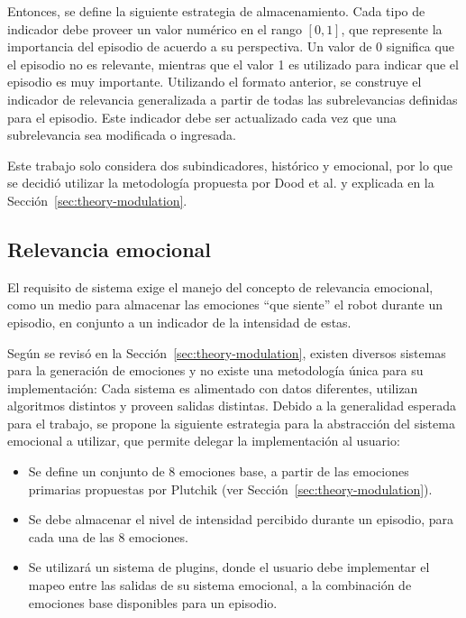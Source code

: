 Entonces, se define la siguiente estrategia de almacenamiento. Cada tipo de indicador debe proveer un valor numérico en el rango $[0, 1]$, que represente la importancia del episodio de acuerdo a su perspectiva. Un valor de 0 significa que el episodio no es relevante, mientras que el valor 1 es utilizado para indicar que el episodio es muy importante. Utilizando el formato anterior, se construye el indicador de relevancia generalizada a partir de todas las subrelevancias definidas para el episodio. Este indicador debe ser actualizado cada vez que una subrelevancia sea modificada o ingresada.

Este trabajo solo considera dos subindicadores, histórico y emocional, por lo que se decidió utilizar la metodología propuesta por Dood et al. y explicada en la Sección~\ref{sec:theory-modulation}.


\subsection{Relevancia emocional}\label{sec:design_ep_rel_emo}

El requisito de sistema  exige el manejo del concepto de relevancia emocional, como un medio para almacenar las emociones ``que siente'' el robot durante un episodio, en conjunto a un indicador de la intensidad de estas.


Según se revisó en la Sección~\ref{sec:theory-modulation}, existen diversos sistemas para la generación de emociones y no existe una metodología única para su implementación: Cada sistema es alimentado con datos diferentes, utilizan algoritmos distintos y proveen salidas distintas. Debido a la generalidad esperada para el trabajo, se propone la siguiente estrategia para la abstracción del sistema emocional a utilizar, que permite delegar la implementación al usuario:
\begin{itemize}
\item Se define un conjunto de 8 emociones base, a partir de las emociones primarias propuestas por Plutchik (ver Sección~\ref{sec:theory-modulation}).
\item Se debe almacenar el nivel de intensidad percibido durante un episodio, para cada una de las 8 emociones.
\item Se utilizará un sistema de plugins, donde el usuario debe implementar el mapeo entre las salidas de su sistema emocional, a la combinación de emociones base disponibles para un episodio.
\end{itemize}

